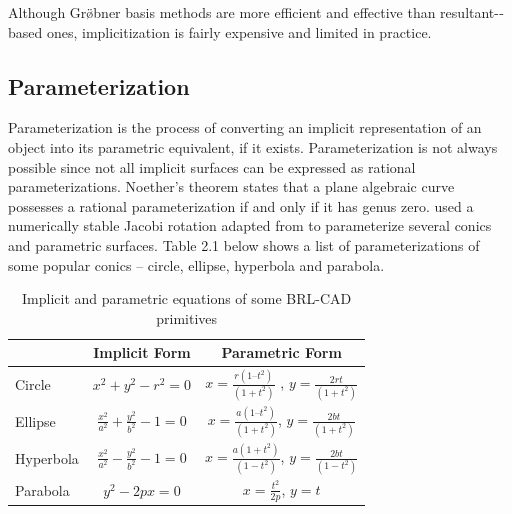 \hspace{20}Although Gr\"\o bner basis methods are more efficient and effective than
resultant-­based ones, implicitization is fairly expensive and limited in practice.  




\subsection{Parameterization}

Parameterization is the process of converting an implicit representation of 
an object into its parametric equivalent, if it exists. Parameterization is not
always possible since not all implicit surfaces can be expressed as rational
parameterizations. Noether's theorem states that a plane algebraic curve
possesses a rational parameterization if and only if it has genus zero. \cite{13} used
a numerically stable Jacobi rotation adapted from \cite{12} to parameterize several
conics and parametric surfaces. Table 2.1 below shows a list of
parameterizations of some popular conics – circle, ellipse, hyperbola and
parabola.
\begin{table}[thbp]
\caption[Implicit and parametric equations of some BRL-­CAD primitives]{Implicit and parametric equations of some BRL­-CAD primitives}
\centering
\begin{tabular}{| l | c | c |}
  \hline
   & Implicit Form & Parametric Form &  \\
  \hline
  Circle & $x^2 + y^2 - r^2 = 0$ &    $x =  \frac{r(1 – t^2)}{(1 + t^2)}$ , $y = \frac{2rt}{(1 + t^2)}$ \\
  \hline
  Ellipse & $\frac{x^2}{a^2} + \frac{y^2}{b^2} - 1 = 0$ &     $x = \frac{a(1 – t^2)}{(1 + t^2)}$, $y = \frac{2bt}{(1 + t^2)}$ \\
  \hline
  Hyperbola & $\frac{x^2}{a^2} - \frac{y^2}{b^2} - 1 = 0$ &     $x = \frac{a(1 + t^2)}{(1 - t^2)}$, $y = \frac{2bt}{(1 - t^2)}$ \\
  \hline
  Parabola & $y^2 - 2px = 0$ &     $ x = \frac{t^2}{2p}$, $ y = t$ \\
  \hline
\end{tabular}
\label{Implicit and Parametric equations}
\end{table}

